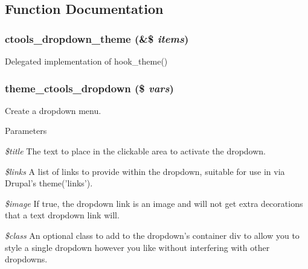\subsection{Function Documentation}
\hypertarget{dropdown_8theme_8inc_a896a70c94dd269a16949457d7da86d41}{
\subsubsection[{ctools\_\-dropdown\_\-theme}]{\setlength{\rightskip}{0pt plus 5cm}ctools\_\-dropdown\_\-theme (\&\$ {\em items})}}
\label{dropdown_8theme_8inc_a896a70c94dd269a16949457d7da86d41}
Delegated implementation of hook\_\-theme() \hypertarget{dropdown_8theme_8inc_a8343d27a7f44c9ecd888fc539a900bfd}{
\subsubsection[{theme\_\-ctools\_\-dropdown}]{\setlength{\rightskip}{0pt plus 5cm}theme\_\-ctools\_\-dropdown (\$ {\em vars})}}
\label{dropdown_8theme_8inc_a8343d27a7f44c9ecd888fc539a900bfd}
Create a dropdown menu.


\begin{DoxyParams}{Parameters}
\item[{\em \$title}]The text to place in the clickable area to activate the dropdown. \item[{\em \$links}]A list of links to provide within the dropdown, suitable for use in via Drupal's theme('links'). \item[{\em \$image}]If true, the dropdown link is an image and will not get extra decorations that a text dropdown link will. \item[{\em \$class}]An optional class to add to the dropdown's container div to allow you to style a single dropdown however you like without interfering with other dropdowns. \end{DoxyParams}
